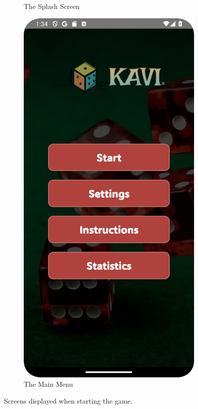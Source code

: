 \begin{figure}[ht!]
\begin{subfigure}[b]{0.27\textwidth}
        \caption{The Splash Screen}
        \label{fig:splash_screen}
    \end{subfigure}
    \hspace{1em}
    \begin{subfigure}[b]{0.27\textwidth}
        \centering
        \includegraphics[width=\textwidth]{img/main menu.png}
        \caption{The Main Menu}
        \label{fig:main_menu}
    \end{subfigure}
    \caption{Screens displayed when starting the game.}
    \label{fig:starting_game}
\end{figure}

